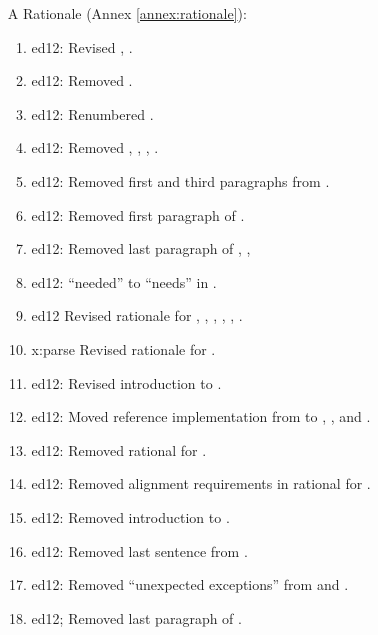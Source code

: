 \begin{itemize}
	\item[A] Rationale (Annex \ref{annex:rationale}):				%
		\begin{enumerate}
		\item \textsf{ed12}: Revised , .
		\item \textsf{ed12}: Removed .
		\item \textsf{ed12}: Renumbered .
		\item \textsf{ed12}: Removed , , ,
			.
		\item \textsf{ed12}: Removed first and third paragraphs from .
		\item \textsf{ed12}: Removed first paragraph of .
		\item \textsf{ed12}: Removed last paragraph of ,
			,
		\item \textsf{ed12}: ``needed'' to ``needs'' in .
		\item \textsf{ed12} Revised rationale for ,
			, , ,
			, .
		\item \textsf{x:parse} Revised rationale for .
		\item \textsf{ed12}: Revised introduction to .
		\item \textsf{ed12}: Moved reference implementation from
			 to \linebreak {}, ,
			 and .
		\item \textsf{ed12}: Removed rational for .
		\item \textsf{ed12}: Removed alignment requirements in rational for
			.
		\item \textsf{ed12}: Removed introduction to .
		\item \textsf{ed12}: Removed last sentence from .
		\item \textsf{ed12}: Removed ``unexpected exceptions'' from
			 and .
		\item \textsf{ed12}; Removed last paragraph of .

\end{enumerate}
\end{itemize}
